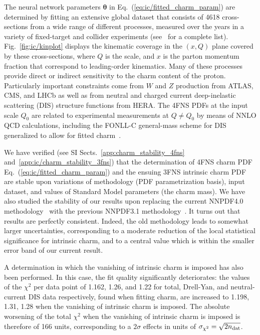 \documentclass[11pt,a4paper]{article}
\begin{document}
The neural network parameters ${\boldsymbol \theta}$ in
Eq.~(\ref{eq:ic/fitted_charm_param})
are determined by fitting an extensive global dataset that consists of 4618 
cross-sections from a wide range of different processes, measured over
the years in a variety of fixed-target and collider experiments  (see~\cite{Ball:2021leu} for a complete list).
%
Fig.~\ref{fig:ic/kinplot} displays the kinematic coverage in the $(x,Q)$ plane
covered by these cross-sections, where $Q$ is
the  scale, and  $x$ is
the parton momentum fraction that correspond to leading-order kinematics.
%
Many of these processes provide direct or indirect sensitivity 
to the charm content of the proton.
%
Particularly important constraints come from $W$ and $Z$ production from 
ATLAS, CMS, and LHCb as well as from
neutral and charged current deep-inelastic 
scattering (DIS) structure functions from HERA.
%
The 4FNS  PDFs at the input scale $Q_0$ are related
to experimental measurements at $Q \not =Q_0$ by means of NNLO QCD calculations, including
the FONLL-C general-mass scheme for DIS~\cite{Forte:2010ta} generalized to 
allow for fitted charm~\cite{Ball:2015tna}.

We have verified (see
SI Sects.~\ref{app:charm_stability_4fns} and~\ref{app:ic/charm_stability_3fns}) that the
determination of 4FNS charm PDF Eq.~(\ref{eq:ic/fitted_charm_param}) and
the ensuing 3FNS intrinsic charm PDF are  stable upon variations
of methodology (PDF parametrization basis), input dataset, and values
of Standard Model parameters (the charm mass).
We have also studied the stability of our results upon replacing the
current NNPDF4.0 methodology~\cite{Ball:2021leu} with the previous
NNPDF3.1 methodology~\cite{NNPDF:2017mvq}. It turns out that results
are  perfectly consistent. Indeed, the old methodology leads to somewhat larger
uncertainties, corresponding to a moderate reduction of the local statistical
significance for intrinsic charm, and to a central value which is
within the smaller  error band of our current result.


A determination in which the vanishing of intrinsic charm is
imposed has also been performed.
%
In this case, the fit quality significantly
deteriorates: the values of the $\chi^2$ per data point of 1.162,
1.26, and 1.22 for total, Drell-Yan, 
and neutral-current DIS data respectively, found when fitting charm, are 
increased to 1.198, 1.31, 1.28 when the vanishing of intrinsic charm
is imposed.
%
The absolute worsening of the total $\chi^2$ when the vanishing of intrinsic charm is imposed is therefore
of 166 units, corresponding to
a $2\sigma$ effects in units of $\sigma_{\chi^2}= \sqrt{2n_{\rm dat}}$.
\end{document}
